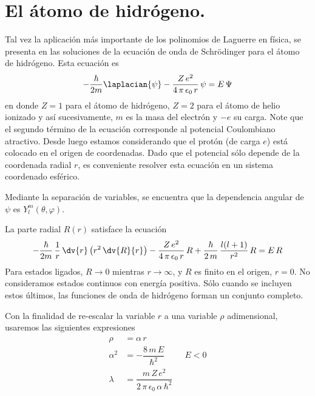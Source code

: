 \section{El átomo de hidrógeno.}
Tal vez la aplicación más importante de los polinomios de Laguerre en física, se presenta en las soluciones de la ecuación de onda de Schrödinger para el átomo de hidrógeno. Esta ecuación es
\begin{align}
- \dfrac{\hbar}{2 m} \laplacian{\psi} - \dfrac{Z \, e^{2}}{4 \, \pi \, \epsilon_{0} \, r} \, \psi = E \, \Psi\label{eq:ecuacion_13_084}
\end{align}
en donde $Z = 1$ para el átomo de hidrógeno, $Z = 2$ para el átomo de helio ionizado y así sucesivamente, $m$ es la masa del electrón y $-e$ su carga. Note que el segundo término de la ecuación corresponde al potencial Coulombiano atractivo. Desde luego estamos considerando que el protón (de carga $e$) está colocado en el origen de coordenadas. Dado que el potencial sólo depende de la coordenada radial $r$, es conveniente resolver esta ecuación en un sistema coordenado esférico.
\par
Mediante la separación de variables, se encuentra que la dependencia angular de $\psi$ es $Y_{l}^{m} (\theta, \varphi)$. 
\par
La parte radial $R(r)$ satisface la ecuación
\begin{align}
- \dfrac{\hbar}{2 m} \, \dfrac{1}{r} \, \dv{r} \left( r^{2} \, \dv{R}{r} \right) - \dfrac{Z \, e^{2}}{4 \, \pi \, \epsilon_{0} \, r} \, R + \dfrac{\hbar}{2 \, m} \, \dfrac{l (l + 1)}{r^{2}} \, R = E \, R
\label{eq:ecuacion_13_085}
\end{align}
Para estados ligados, $R \to 0$ mientras $r \to \infty$, y $R$ es finito en el origen, $r = 0$. No consideramos estados continuos con energía positiva. Sólo cuando se incluyen estos últimos, las funciones de onda de hidrógeno forman un conjunto completo.
\par
Con la finalidad de re-escalar la variable $r$ a una variable $\rho$ adimensional, usaremos las siguientes expresiones
\begin{align}
\begin{aligned}
\rho &= \alpha \, r \\[0.5em]
\alpha^{2} &= - \dfrac{8 \, m \, E}{\hbar^{2}} \hspace{1cm} E < 0 \\[0.5em]
\lambda &= \dfrac{m \, Z \, e^{2}}{ 2 \, \pi \, \epsilon_{0} \, \alpha \, \hbar^{2}}
\end{aligned}
\label{eq:ecuacion_13_086}
\end{align}
